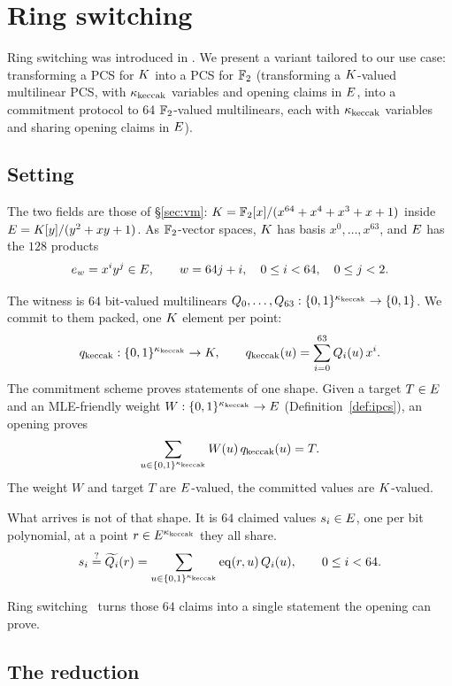 \section{Ring switching}\label{annex:rs}

Ring switching was introduced in \cite{DP24}. We present a variant tailored to our use case: transforming a PCS for $K$ into a PCS for $\mathbb{F}_2$ (transforming a $K$-valued multilinear PCS, with $\kappa_{\mathrm{keccak}}$ variables and opening claims in $E$, into a commitment protocol to 64 $\mathbb{F}_2$-valued multilinears, each with $\kappa_{\mathrm{keccak}}$ variables and sharing opening claims in $E$).

\subsection{Setting}\label{rs:setting}

The two fields are those of \S\ref{sec:vm}: $K=\mathbb{F}_2[x]/(x^{64}+x^4+x^3+x+1)$ inside $E=K[y]/(y^2+xy+1)$. As $\mathbb{F}_2$-vector spaces, $K$ has basis $x^0,\dots,x^{63}$, and $E$ has the $128$ products
\[
e_w=x^iy^j\in E,\qquad w=64j+i,\quad 0\le i<64,\quad 0\le j<2.
\]

The witness is $64$ bit-valued multilinears $Q_0,\dots,Q_{63}:\{0,1\}^{\kappa_{\mathrm{keccak}}}\to\{0,1\}$. We commit to them packed, one $K$ element per point:
\[
q_{\mathrm{keccak}}:\{0,1\}^{\kappa_{\mathrm{keccak}}}\to K,\qquad q_{\mathrm{keccak}}(u)=\sum_{i=0}^{63}Q_i(u)\,x^i.
\]
The commitment scheme proves statements of one shape. Given a target $T\in E$ and an MLE-friendly weight $W:\{0,1\}^{\kappa_{\mathrm{keccak}}}\to E$ (Definition~\ref{def:ipcs}), an opening proves
\[
\sum_{u\in\{0,1\}^{\kappa_{\mathrm{keccak}}}}W(u)\,q_{\mathrm{keccak}}(u)=T.
\]
The weight $W$ and target $T$ are $E$-valued, the committed values are $K$-valued.

What arrives is not of that shape. It is $64$ claimed values $s_i\in E$, one per bit polynomial, at a point $r\in E^{\kappa_{\mathrm{keccak}}}$ they all share.
\[
s_i \stackrel{?}{=} \widetilde{Q_i}(r)=\sum_{u\in\{0,1\}^{\kappa_{\mathrm{keccak}}}}\operatorname{eq}(r,u)\,Q_i(u),\qquad 0\le i<64.
\]

Ring switching~\cite{DP24} turns those $64$ claims into a single statement the opening can prove.

\subsection{The reduction}\label{rs:reduction}

